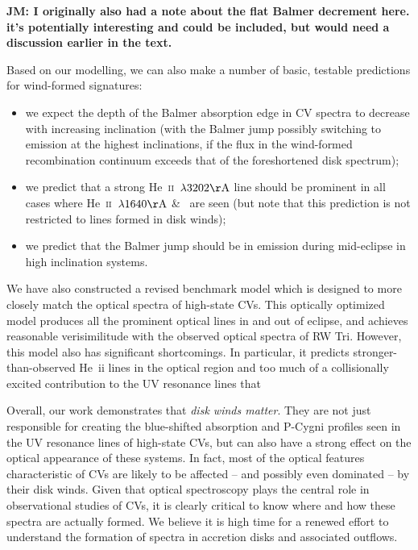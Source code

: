 \documentclass[preprint, a4paper, 11pt]{aastex}
\begin{document}
{\bf JM: I originally also had a note about the flat Balmer decrement here.
it's potentially interesting and could be included, but would need a discussion
earlier in the text.}


\noindent Based on our modelling, we can also make a number of basic,
testable predictions for wind-formed signatures:
\begin{itemize}
	\item we expect the depth of the Balmer absorption edge in CV
          spectra to decrease with increasing inclination (with the
          Balmer jump possibly switching to emission at the highest
          inclinations, if the flux in the wind-formed recombination
          continuum exceeds that of the foreshortened disk spectrum);
	\item we predict that a strong He~\textsc{ii}~$\lambda3202{\rm
          \AA}$ line should be prominent in all cases where
          He~\textsc{ii}~$\lambda1640{\rm \AA}$ \& \heiiopt\ are seen
          (but note that this prediction is not restricted to lines
          formed in disk winds);
	\item we predict that the Balmer jump should be in emission
          during mid-eclipse in high inclination systems.
\end{itemize}

\smallskip
We have also constructed a revised benchmark model which is designed
to more closely match the optical spectra of high-state CVs. This
optically optimized model produces all the prominent optical lines in
and out of eclipse, and achieves reasonable verisimilitude with the
observed optical spectra of RW Tri. However, this model also has
significant shortcomings. In particular, it predicts
stronger-than-observed He~{\sc ii} lines in the optical region and too
much of a collisionally excited contribution to the UV resonance lines
that  

Overall, our work demonstrates that {\sl disk winds matter}. They are
not just responsible for creating the blue-shifted absorption and
P-Cygni profiles seen in the UV resonance lines of high-state CVs, but
can also have a strong effect on the optical appearance of these
systems. In fact, most of the optical features characteristic of CVs
are likely to be affected -- and possibly even dominated -- by their disk
winds. Given that optical spectroscopy plays the central role in
observational studies of CVs, it is clearly critical to know 
where and how these spectra are actually formed. We believe it is high
time for a renewed effort to understand the formation of spectra in
accretion disks and associated outflows. 
\end{document}
